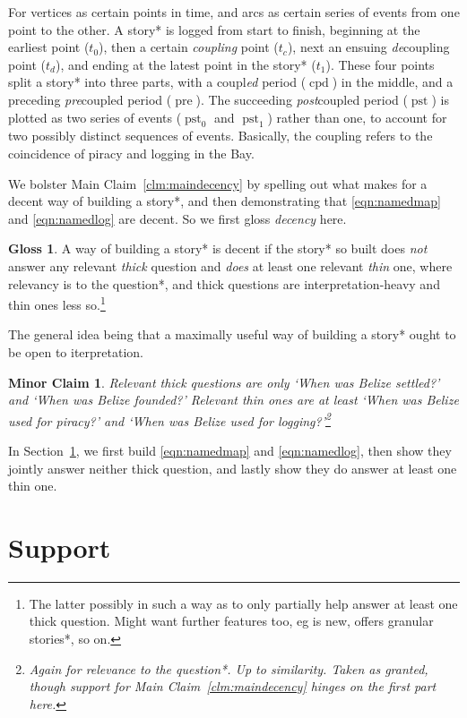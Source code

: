 \documentclass{amsart}
\newcommand{\mention}[1]{\textit{#1}} %
\DeclareMathOperator{\pre}{pre} %
\DeclareMathOperator{\pst}{pst} %
\DeclareMathOperator{\cpd}{cpd} %
\newtheorem{minrclm}{Minor Claim} %
\theoremstyle{definition}
\newtheorem{gloss}{Gloss} %
\theoremstyle{remark}
\begin{document}
	For vertices as certain points in time, and arcs as certain series of events from one point to the other. A story* is logged from start to finish, beginning at the earliest point (\(t_0\)), then a certain \mention{coupling} point (\(t_c\)), next an ensuing \mention{de}coupling point (\(t_d\)), and ending at the latest point in the story* (\(t_1\)). These four points split a story* into three parts, with a coupl\mention{ed} period (\(\cpd\)) in the middle, and a preceding \mention{pre}coupled period (\(\pre\)). The succeeding \mention{post}coupled period (\(\pst\)) is plotted as two series of events (\(\pst_0\) and \(\pst_1\)) rather than one, to account for two possibly distinct sequences of events. Basically, the coupling refers to the coincidence of piracy and logging in the Bay.
	
	We bolster Main Claim~\ref{clm:maindecency} by spelling out what makes for a decent way of building a story*, and then demonstrating that \ref{eqn:namedmap} and \ref{eqn:namedlog} are decent. So we first gloss \mention{decency} here.
	\begin{gloss}
	\label{gloss:decency}
		A way of building a story* is decent if the story* so built does \emph{not} answer any relevant \mention{thick} question and \emph{does} at least one relevant \mention{thin} one, where relevancy is to the question*, and thick questions are interpretation-heavy and thin ones less so.\footnote{The latter possibly in such a way as to only partially help answer at least one thick question. Might want further features too, eg is new, offers granular stories*, so on.}
	\end{gloss}
	The general idea being that a maximally useful way of building a story* ought to be open to iterpretation.
	\begin{minrclm}
	\label{clm:minorquestions}
	Relevant thick questions are only `When was Belize settled?' and `When was Belize founded?' Relevant thin ones are at least `When was Belize used for piracy?' and `When was Belize used for logging?'\footnote{Again for relevance to the question*. Up to similarity. Taken as granted, though support for Main Claim~\ref{clm:maindecency} hinges on the first part here.}
	\end{minrclm}
	In Section~\ref{s:support}, we first build \ref{eqn:namedmap} and \ref{eqn:namedlog}, then show they jointly answer neither thick question, and lastly show they do answer at least one thin one.
%
%
%
\section{Support}
\label{s:support}
\end{document}
